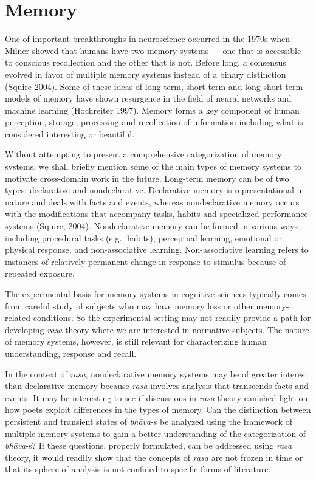 \section*{Memory}

One of important breakthroughs in neuroscience occurred in the 1970s when Milner showed that humans have two memory systems --- one that is accessible to conscious recollection and the other that is not. Before long, a consensus evolved in favor of multiple memory systems instead of a binary distinction (Squire 2004). Some of these ideas of long-term, short-term and long-short-term models of memory have shown resurgence in the field of neural networks and machine learning (Hochreiter 1997). Memory forms a key component of human perception, storage, processing and recollection of information including what is considered interesting or beautiful. 

Without attempting to present a comprehensive categorization of memory systems, we shall briefly mention some of the main types of memory systems to motivate cross-domain work in the future. Long-term memory can be of two types: declarative and nondeclarative. Declarative memory is representational in nature and deals with facts and events, whereas nondeclarative memory occurs with the modifications that accompany tasks, habits and specialized performance systems (Squire, 2004). Nondeclarative memory can be formed in various ways including procedural tasks (e.g., habits), perceptual learning, emotional or physical response, and non-associative learning. Non-associative learning refers to instances of relatively permanent change in response to stimulus because of repeated exposure. 

The experimental basis for memory systems in cognitive sciences typically comes from careful study of subjects who may have memory loss or other memory-related conditions. So the experimental setting may not readily provide a path for developing \textsl{rasa} theory where we are interested in normative subjects. The nature of memory systems, however, is still relevant for characterizing human understanding, response and recall.

In the context of \textsl{rasa}, nondeclarative memory systems may be of greater interest than declarative memory because \textsl{rasa} involves analysis that transcends facts and events. It may be interesting to see if discussions in \textsl{rasa} theory can shed light on how poets exploit differences in the types of memory. Can the distinction between persistent and transient states of \textsl{bhāva}-s be analyzed using the framework of multiple memory systems to gain a better understanding of the categorization of \textsl{bhāva}-s? If these questions, properly formulated, can be addressed using \textsl{rasa} theory, it would readily show that the concepts of \textsl{rasa} are not frozen in time or that its sphere of analysis is not confined to specific forms of literature.

